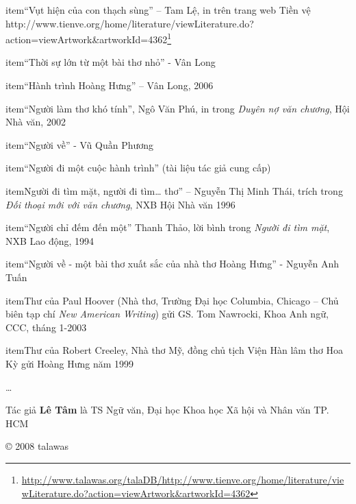 \documentclass[../main.tex]{subfiles}
\begin{document}
\begin{multicols}{2}
\begin{enumerate}
item{“Vụt hiện của con thạch sùng” – Tam Lệ, in trên trang web Tiền vệ  
http://www.tienve.org/home/literature/viewLiterature.do?action=viewArtwork&artworkId=4362\footnote{\url{http://www.talawas.org/talaDB/http://www.tienve.org/home/literature/viewLiterature.do?action=viewArtwork&artworkId=4362}}
}

item{“Thời sự lớn từ một bài thơ nhỏ” - Vân Long}

item{“Hành trình Hoàng Hưng” – Vân Long, 2006}

item{“Người làm thơ khó tính”, Ngô Văn Phú, in trong \textit{Duyên nợ văn chương}, Hội Nhà văn, 2002}

item{“Người về” - Vũ Quần Phương}

item{“Người đi một cuộc hành trình” (tài liệu tác giả cung cấp)}

item{Người đi tìm mặt, người đi tìm… thơ” – Nguyễn Thị Minh Thái, trích trong \textit{Đối thoại mới với văn chương}, NXB Hội Nhà văn 1996}

item{“Người chỉ đếm đến một” Thanh Thảo, lời bình trong \textit{Người đi tìm mặt}, NXB Lao động, 1994}

item{“Người về - một bài thơ xuất sắc của nhà thơ Hoàng Hưng” - Nguyễn Anh Tuấn }

item{Thư của Paul Hoover (Nhà thơ, Trường Đại học Columbia, Chicago – Chủ biên tạp chí \textit{New American Writing}) gửi GS. Tom Nawrocki,  Khoa Anh ngữ, CCC, tháng 1-2003}

item{Thư của Robert Creeley, Nhà thơ Mỹ, đồng chủ tịch Viện Hàn lâm thơ Hoa Kỳ gửi Hoàng Hưng năm 1999 }

\end{enumerate}
 … 
 
 
Tác giả \textbf{Lê Tâm} là TS Ngữ văn, Đại học Khoa học Xã hội và Nhân văn TP. HCM 
 
© 2008 talawas   
\end{multicols}
\end{document}
